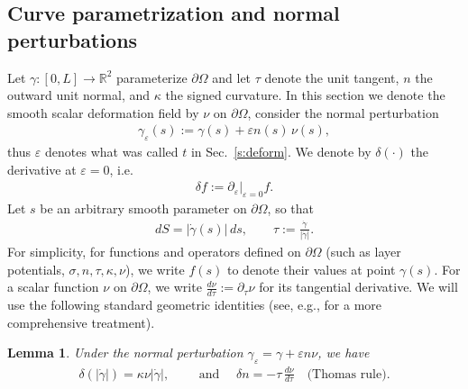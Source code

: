 \documentclass{amsart}
\theoremstyle{plain}
\newtheorem{lemma}[theorem]{Lemma}
\begin{document}
\subsection{Curve parametrization and normal perturbations}
Let $\gamma:[0,L]\to\mathbb{R}^2$ parameterize $\partial \Omega$ and let $\tau$ denote the unit tangent, $n$ the outward unit normal, and $\kappa$ the signed curvature.
In this section we denote the smooth scalar deformation field by $\nu$ on $\partial \Omega$, consider the normal perturbation
  \begin{align}
    \gamma_\varepsilon(s) := \gamma(s) + \varepsilon n(s)\,\nu(s),
  \end{align}
thus $\varepsilon$ denotes what was called $t$ in Sec.~\ref{s:deform}.
We denote by $\delta(\cdot)$ the derivative at $\varepsilon=0$, i.e.
  \begin{align}
    \delta f := \partial_\varepsilon|_{\varepsilon=0} f.
  \end{align}
Let $s$ be an arbitrary smooth parameter on $\partial \Omega$, so that
  \begin{align}
    dS = |\dot\gamma(s)|\,ds,\qquad \tau := \frac{\dot\gamma}{|\dot\gamma|}.
  \end{align}
For simplicity, for functions and operators defined on $\partial\Omega$ (such as layer potentials, $\sigma,n,\tau,\kappa,\nu$), we write $f(s)$ to denote their values at point $\gamma(s)$.
For a scalar function $\nu$ on $\partial \Omega$, we write $\frac{d\nu}{d\tau}:=\partial_\tau \nu$ for its tangential derivative.
We will use the following standard geometric identities (see, e.g., \cite{delfour2011shapes} for a more comprehensive treatment).
\begin{lemma}\label{lem: geometric_variations}
Under the normal perturbation $\gamma_\varepsilon=\gamma+\varepsilon n \nu$, we have
  \begin{align}
    \delta(|\dot\gamma|) = \kappa \nu|\dot\gamma|,
    \qquad \mbox{ and } \quad \delta n = -\tau\,\frac{d\nu}{d\tau}
    \quad \mbox{(Thomas rule)}.
  \end{align}
\end{lemma}
\end{document}
